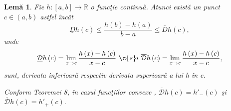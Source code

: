 \documentclass[a4paper,12pt,oneside]{report}
\newtheorem{lemma}{Lem\u{a}}
\begin{document}
\begin{lemma}
Fie \(h : \left [ a,b\right ]\rightarrow \mathbb{R}\) o func\c{t}ie continu\u{a}. Atunci exist\u{a} un punct \(c \in \left ( a,b \right )\) astfel \^{i}nc\^{a}t
\begin{displaymath}
   \underline{D}h\left ( c \right ) \leq  \frac{h\left ( b \right ) - h\left ( a \right )}{b-a}\leq \overline{D}h\left ( c \right ),
\end{displaymath}
unde
\begin{displaymath}
   \underline{\mathcal{D}}h\left ( c \right ) = \lim_{x\rightarrow c}  \frac{h\left ( x \right ) - h\left ( c \right )}{x-c} ~\c{s}i ~ \overline{\mathcal{D}}h\left ( c \right ) = \lim_{x\rightarrow c}  \frac{h\left ( x \right ) - h\left ( c \right )}{x-c},
\end{displaymath}
sunt, derivata inferioar\u{a} respectiv derivata superioar\u{a} a lui h \^{i}n c.

Conform Teoremei 8, \^{i}n cazul func\c{t}iilor convexe , \(\overline{\mathcal{D}}h\left ( c \right ) = {h}'_{-}\left ( c \right )\)  \c{s}i   \(\overline{\mathcal{D}}h\left ( c \right )  = {h}'_{+}\left ( c \right ).\)
\end{lemma}
\end{document}
